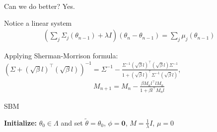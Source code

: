 \documentclass{beamer}
\begin{document}
\begin{frame}{Can we do better? Yes.}
  \begin{block}{Notice a linear system}
    \begin{equation}
      \begin{aligned}
        (\sum_j \Sigma_{j}(\theta_{n-1}) + \lambda I) (\theta_n - \theta_{n-1}) = \sum_{j} \mu_j(\theta_{n-1})
      \end{aligned}
     \end{equation} 
  \end{block}
\begin{block}{}
  Applying Sherman-Morrison formula:
  $(\Sigma + (\sqrt{\beta}l)^{\top}(\sqrt{\beta}l))^{-1} = \Sigma^{-1} - \frac{\Sigma^{-1} (\sqrt{\beta}l)^{\top}(\sqrt{\beta}l)\Sigma^{-1}}{1 + (\sqrt{\beta}l)^{\top} \Sigma^{-1} (\sqrt{\beta}l)}$,
  \begin{equation}
    \begin{aligned}
      M_{n+1} = M_{n} - \frac{\beta M_n l^{\top} l M_n}{1 + \beta l^{\top} M_n l}
    \end{aligned}
    \label{sherman}
   \end{equation} 
\end{block}
\end{frame}

\begin{frame}{}
  \begin{algorithm}[H]
    {\footnotesize
    \caption{SBM}
    \textbf{Initialize:} $\theta_0 \in \Lambda$ and set $\tilde{\theta} = \theta_0$,  $\phi = \textbf{0}$,  $M = \frac{1}{\lambda} I$,  $\mu = 0$\;    
    \KwOut{$\hat{\theta} = \tilde{\theta}$} }
    \end{algorithm}
\end{frame}
\end{document}
